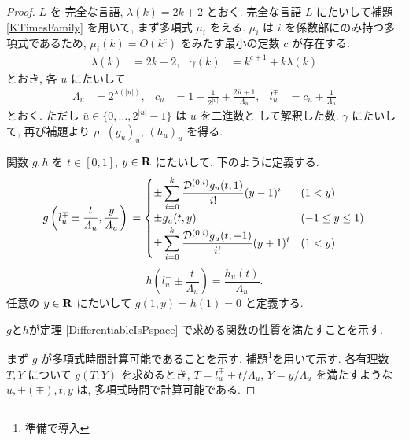 \begin{proof}
 $L$ を \PSPACE 完全な言語, $\lambda(k) = 2k+2$ とおく.
 \PSPACE 完全な言語 $L$ にたいして補題 \ref{KTimesFamily} を用いて,
 まず多項式 $\mu_i$ をえる.
 $\mu_i$ は $i$ を係数部にのみ持つ多項式であるため,
 $\mu_i(k) = O(k^c)$ をみたす最小の定数 $c$ が存在する.
 \begin{align}
  \lambda(k) &= 2k + 2,&
  \gamma(k) &= k^{c+1} + k \lambda(k)
 \end{align}
 とおき, 各 $u$ にたいして 
\begin{align}
 \Lambda_u 
 &= 2^{\lambda(|u|)}, &
 c_u 
 &= 1-\frac{1}{2^{|u|}}+\frac{2\bar{u}+1}{\Lambda_u}, &
 l_u^\mp 
 &= c_u\mp\frac{1}{\varLambda_u} 
\end{align}  
 とおく. ただし $\bar u \in \{0, \dots, 2^{|u|} - 1\}$ は $u$ を二進数と
 して解釈した数.
 $\gamma$ にたいして, 再び補題より $\rho$, $(g_u)_u$, $(h_u)_u$ を得る.

 関数 $g,h$ を $t \in [0,1]$, $y \in \mathbf R$ にたいして, 下のように定義する.
 \begin{equation}
  g\left(l^\mp_u \pm \frac{t}{\varLambda_u}, \frac{y}{\varLambda_u}\right) \\
   = \begin{cases}
      \pm \displaystyle \sum_{i=0}^k \frac{\mathcal D^{(0,i)}g_u(t,1)}{i!} (y-1)^i 
      &  (1<y) \\
      \pm g_u(t, y)      & (-1 \le y \le 1) \\
      \pm \displaystyle \sum_{i=0}^k \frac{\mathcal D^{(0,i)}g_u(t,-1)}{i!} (y+1)^i  
      &  (1<y) \\
     \end{cases}
 \end{equation}
 \begin{equation}
  h \left( l^\mp_u \pm \frac{t}{\Lambda_u} \right) 
   = \frac{h_u(t)}{\Lambda_u}.
 \end{equation}
 任意の $y\in \mathbf R$ にたいして $g(1,y) = h(1) = 0$ と定義する.

 $g$と$h$が定理 \ref{DifferentiableIsPspace} で求める関数の性質を満たすことを示す.
 
 まず $g$ が多項式時間計算可能であることを示す.
 補題\footnote{準備で導入}を用いて示す.
 各有理数 $T,Y$ について $g(T, Y)$ を求めるとき,
 $T=l_u^\mp \pm t/\Lambda_u$, $Y = y/\Lambda_u$ を満たすような
 $u, \pm(\mp), t, y$ は, 多項式時間で計算可能である.


\end{proof}
